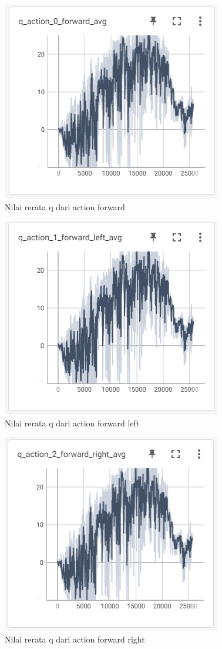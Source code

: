 \begin{figure}[H] 
	\centering
	\includegraphics[width=.7\linewidth]{images/q_action_0_forward_avg}
	\caption{Nilai rerata q dari action forward}
	\label{fig:q_action_0_forward_avg}
\end{figure}
\begin{figure}[H] 
	\centering
	\includegraphics[width=.7\linewidth]{images/q_action_1_forward_left_avg}
	\caption{Nilai rerata q dari action forward left}
	\label{fig:q_action_1_forward_left_avg}
\end{figure}
\begin{figure}[H] 
	\centering
	\includegraphics[width=.7\linewidth]{images/q_action_2_forward_right_avg}
	\caption{Nilai rerata q dari action forward right}
	\label{fig:q_action_2_forward_right_avg}
\end{figure}

